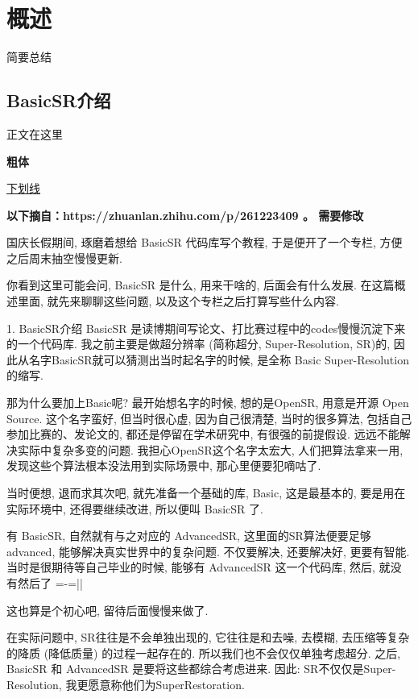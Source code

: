 \documentclass[../main.tex]{subfiles}
\begin{document}
\chapter{概述}
\vspace{-2cm}

简要总结

\section{BasicSR介绍}

正文在这里

\textbf{粗体}

\uline{下划线}
\newline

\textbf{以下摘自：https://zhuanlan.zhihu.com/p/261223409 。 需要修改}

国庆长假期间, 琢磨着想给 BasicSR 代码库写个教程, 于是便开了一个专栏, 方便之后周末抽空慢慢更新.

你看到这里可能会问, BasicSR 是什么, 用来干啥的, 后面会有什么发展. 在这篇概述里面, 就先来聊聊这些问题, 以及这个专栏之后打算写些什么内容.

1. BasicSR介绍
BasicSR 是读博期间写论文、打比赛过程中的codes慢慢沉淀下来的一个代码库. 我之前主要是做超分辨率 (简称超分, Super-Resolution, SR)的, 因此从名字BasicSR就可以猜测出当时起名字的时候, 是全称 Basic Super-Resolution的缩写.

那为什么要加上Basic呢? 最开始想名字的时候, 想的是OpenSR, 用意是开源 Open Source. 这个名字蛮好, 但当时很心虚, 因为自己很清楚, 当时的很多算法, 包括自己参加比赛的、发论文的, 都还是停留在学术研究中, 有很强的前提假设. 远远不能解决实际中复杂多变的问题. 我担心OpenSR这个名字太宏大, 人们把算法拿来一用, 发现这些个算法根本没法用到实际场景中, 那心里便要犯嘀咕了.

当时便想, 退而求其次吧, 就先准备一个基础的库, Basic, 这是最基本的, 要是用在实际环境中, 还得要继续改进, 所以便叫 BasicSR 了.

有 BasicSR, 自然就有与之对应的 AdvancedSR, 这里面的SR算法便要足够advanced, 能够解决真实世界中的复杂问题. 不仅要解决, 还要解决好, 更要有智能. 当时是很期待等自己毕业的时候, 能够有 AdvancedSR 这一个代码库, 然后, 就没有然后了 =-=||

这也算是个初心吧, 留待后面慢慢来做了.

在实际问题中, SR往往是不会单独出现的, 它往往是和去噪, 去模糊, 去压缩等复杂的降质 (降低质量) 的过程一起存在的. 所以我们也不会仅仅单独考虑超分. 之后, BasicSR 和 AdvancedSR 是要将这些都综合考虑进来. 因此: SR不仅仅是Super-Resolution, 我更愿意称他们为SuperRestoration.
\end{document}
